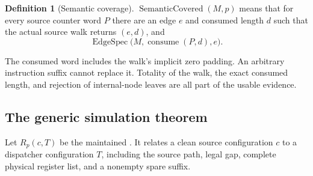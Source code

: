 \documentclass[11pt,letterpaper]{article}
\theoremstyle{definition}\newtheorem{definition}[theorem]{Definition}
\theoremstyle{remark}\newtheorem{remark}[theorem]{Remark}
\newcommand{\code}[1]{\texttt{\detokenize{#1}}}
\newcommand{\SemCov}{\operatorname{SemanticCovered}}
\newcommand{\EdgeSpec}{\operatorname{EdgeSpec}}
\begin{document}
\begin{definition}[Semantic coverage]
$\SemCov(M,p)$ means that for every source counter word $P$ there are an edge $e$ and consumed length $d$ such that the actual source walk returns $(e,d)$, and
\[
\EdgeSpec\bigl(M,\operatorname{consume}(P,d),e\bigr).
\]
\end{definition}

The consumed word includes the walk's implicit zero padding. An arbitrary instruction suffix cannot replace it. Totality of the walk, the exact consumed length, and rejection of internal-node leaves are all part of the usable evidence.

\subsection{The generic simulation theorem}

Let $R_p(c,T)$ be the maintained \code{KSim.Rel}. It relates a clean source configuration $c$ to a dispatcher configuration $T$, including the source path, legal gap, complete physical register list, and a nonempty spare suffix.
\end{document}
